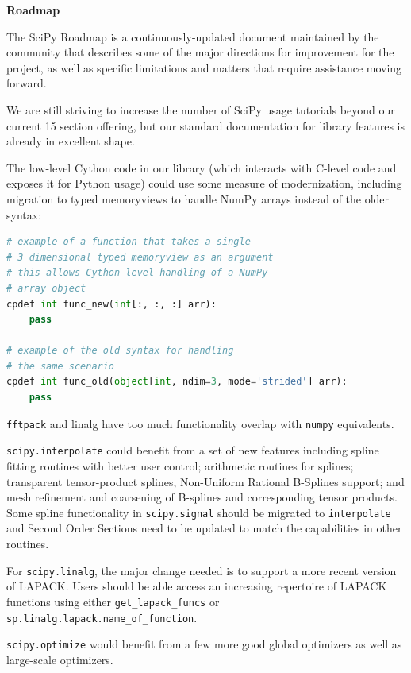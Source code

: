 \documentclass[fleqn,10pt]{wlscirep}
\begin{document}
\textbf{Roadmap}

The SciPy Roadmap\cite{SciPy_roadmap} is a continuously-updated document
maintained by the community that describes some of the major directions
for improvement for the project, as well as specific limitations and
matters that require assistance moving forward.

We are still striving to increase the number of SciPy usage tutorials beyond
our current 15 section offering\cite{SciPy_tutorials}, but our
standard documentation for library features is already in excellent shape.


The low-level Cython code in our library (which interacts with C-level
code and exposes it for Python usage) could use some measure of modernization,
including migration to typed memoryviews to handle NumPy arrays instead of
the older syntax:

\begin{lstlisting}[language=Python]
# example of a function that takes a single
# 3 dimensional typed memoryview as an argument
# this allows Cython-level handling of a NumPy
# array object
cpdef int func_new(int[:, :, :] arr):
    pass

# example of the old syntax for handling
# the same scenario
cpdef int func_old(object[int, ndim=3, mode='strided'] arr):
    pass

\end{lstlisting}

\texttt{fftpack} and {linalg} have too much functionality overlap with
\texttt{numpy} equivalents.

\texttt{scipy.interpolate} could benefit from a set of new features including
spline fitting routines with better user control; arithmetic routines for splines;
transparent tensor-product splines, Non-Uniform Rational B-Splines support;
and mesh refinement and coarsening of B-splines and corresponding tensor products.
Some spline functionality in \texttt{scipy.signal} should be migrated to \texttt{interpolate} 
and Second Order Sections need to be updated to match the capabilities in other routines.

For \texttt{scipy.linalg}, the major change needed is to support a more recent
version of LAPACK. Users should be able access an increasing repertoire of
LAPACK functions using either \texttt{get\_lapack\_funcs} or
\texttt{sp.linalg.lapack.name\_of\_function}.

\texttt{scipy.optimize} would benefit from a few more good global optimizers 
as well as large-scale optimizers.
\end{document}
